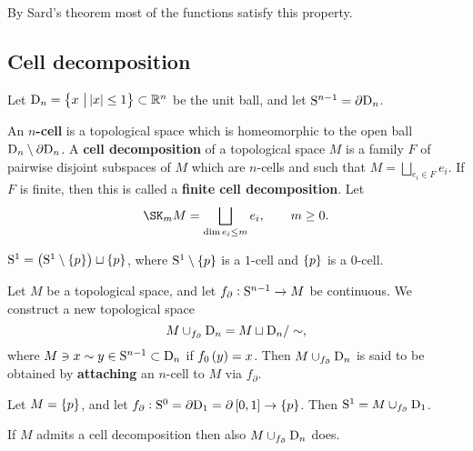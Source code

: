 \begin{fact*}
By Sard's theorem most of the functions satisfy this property.
\end{fact*}

\subsection{Cell decomposition}


\begin{notation*}
Let $ \D_n = \cbr{x \st \abs{x} \le 1} \subset \RR^n $ be the unit ball, and let $ \S^{n - 1} = \partial\D_n $.
\end{notation*}

\begin{definition}
An \textbf{$ n $-cell} is a topological space which is homeomorphic to the open ball $ \D_n \setminus \partial\D_n $. A \textbf{cell decomposition} of a topological space $ M $ is a family $ F $ of pairwise disjoint subspaces of $ M $ which are $ n $-cells and such that $ M = \bigsqcup_{e_i \in F} e_i $. If $ F $ is finite, then this is called a \textbf{finite cell decomposition}. Let
$$ \SK_m M = \bigsqcup_{\dim e_i \le m} e_i, \qquad m \ge 0. $$
\end{definition}

\begin{example}
$ \S^1 = \br{\S^1 \setminus \cbr{p}} \sqcup \cbr{p} $, where $ \S^1 \setminus \cbr{p} $ is a $ 1 $-cell and $ \cbr{p} $ is a $ 0 $-cell.
\end{example}

\begin{notation}
Let $ M $ be a topological space, and let $ f_\partial : \S^{n - 1} \to M $ be continuous. We construct a new topological space
$$ M \cup_{f_\partial} \D_n = M \sqcup \D_n / \sim, $$
where $ M \ni x \sim y \in \S^{n - 1} \subset \D_n $ if $ f_0\br{y} = x $. Then $ M \cup_{f_\partial} \D_n $ is said to be obtained by \textbf{attaching} an $ n $-cell to $ M $ via $ f_\partial $.
\end{notation}

\begin{example*}
Let $ M = \cbr{p} $, and let $ f_\partial : \S^0 = \partial\D_1 = \partial\sbr{0, 1} \to \cbr{p} $. Then $ \S^1 = M \cup_{f_\partial} \D_1 $.
\end{example*}

\begin{exercise*}
If $ M $ admits a cell decomposition then also $ M \cup_{f_\partial} \D_n $ does.
\end{exercise*}

